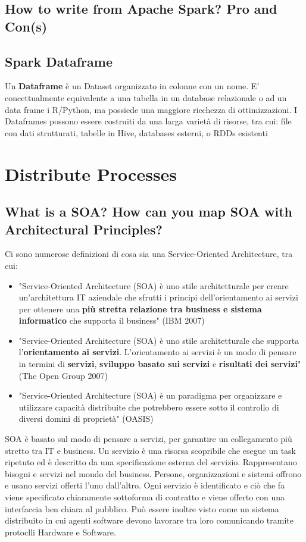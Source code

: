 \documentclass{article}
\begin{document}
\subsection{How to write from Apache Spark? Pro and Con(s)}
\subsection{Spark Dataframe}
Un \textbf{Dataframe} è un Dataset organizzato in colonne con un nome. E' concettualmente equivalente a una tabella in un database relazionale o ad un data frame i R/Python, ma possiede una maggiore ricchezza di ottimizzazioni. 
\newline I Dataframes possono essere costruiti da una larga varietà di risorse, tra cui: file con dati strutturati, tabelle in Hive, databases esterni, o RDDs esistenti

\section{Distribute Processes}
\subsection{What is a SOA? How can you map SOA with Architectural Principles?}
Ci sono numerose definizioni di cosa sia una Service-Oriented Architecture, tra cui:
\begin{itemize}
    \item "Service-Oriented Architecture (SOA) è uno stile architetturale per creare un'architettura IT aziendale che sfrutti i principi dell'orientamento ai servizi per ottenere una \textbf{più stretta relazione tra business e sistema informatico} che supporta il business" (IBM 2007)
    \item "Service-Oriented Architecture (SOA) è uno stile architetturale che supporta l'\textbf{orientamento ai servizi}. L'orientamento ai servizi è un modo di pensare in termini di \textbf{servizi}, \textbf{sviluppo basato sui servizi} e \textbf{risultati dei servizi}" (The Open Group 2007)
    \item "Service-Oriented Architecture (SOA) è un paradigma per organizzare e utilizzare capacità distribuite che potrebbero essere sotto il controllo di diversi domini di proprietà" (OASIS)
\end{itemize}

SOA è basato sul modo di pensare a servizi, per garantire un collegamento più stretto tra IT e business. 
Un servizio è una risorsa scopribile che esegue un task ripetuto ed è descritto da una specificazione esterna del servizio.
Rappresentano bisogni e servizi nel mondo del business. Persone, organizzazioni e sistemi offrono e usano servizi offerti l'uno dall'altro.
Ogni servizio è identificato e ciò che fa viene specificato chiaramente sottoforma di contratto e viene offerto con una interfaccia ben chiara al pubblico. 
Può essere inoltre visto come un sistema distribuito in cui agenti software devono lavorare tra loro comunicando tramite protoclli Hardware e Software.
\end{document}
